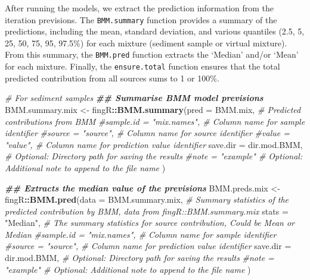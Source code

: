 \documentclass[
]{article}
\newenvironment{Shaded}{\begin{snugshade}}{\end{snugshade}}
\newcommand{\AttributeTok}[1]{\textcolor[rgb]{0.13,0.29,0.53}{#1}}
\newcommand{\CommentTok}[1]{\textcolor[rgb]{0.56,0.35,0.01}{\textit{#1}}}
\newcommand{\DocumentationTok}[1]{\textcolor[rgb]{0.56,0.35,0.01}{\textbf{\textit{#1}}}}
\newcommand{\FunctionTok}[1]{\textcolor[rgb]{0.13,0.29,0.53}{\textbf{#1}}}
\newcommand{\NormalTok}[1]{#1}
\newcommand{\OtherTok}[1]{\textcolor[rgb]{0.56,0.35,0.01}{#1}}
\newcommand{\SpecialCharTok}[1]{\textcolor[rgb]{0.81,0.36,0.00}{\textbf{#1}}}
\newcommand{\StringTok}[1]{\textcolor[rgb]{0.31,0.60,0.02}{#1}}
\begin{document}
After running the models, we extract the prediction information from the
iteration previsions. The \texttt{BMM.summary} function provides a
summary of the predictions, including the mean, standard deviation, and
various quantiles (2.5, 5, 25, 50, 75, 95, 97.5\%) for each mixture
(sediment sample or virtual mixture). From this summary, the
\texttt{BMM.pred} function extracts the `Median' and/or `Mean' for each
mixture. Finally, the \texttt{ensure.total} function ensures that the
total predicted contribution from all sources sums to 1 or 100\%.

\begin{Shaded}
\begin{Highlighting}[]
\CommentTok{\# For sediment samples}
\DocumentationTok{\#\# Summarise BMM model previsions}
\NormalTok{BMM.summary.mix }\OtherTok{\textless{}{-}}\NormalTok{ fingR}\SpecialCharTok{::}\FunctionTok{BMM.summary}\NormalTok{(}\AttributeTok{pred =}\NormalTok{ BMM.mix,            }\CommentTok{\# Predicted contributions from BMM}
                                      \CommentTok{\#sample.id = "mix.names",  \# Column name for sample identifier}
                                      \CommentTok{\#source = "source",        \# Column name for source identifier}
                                      \CommentTok{\#value = "value",          \# Column name for prediction value identifier}
                                      \AttributeTok{save.dir =}\NormalTok{ dir.mod.BMM,    }\CommentTok{\# Optional: Directory path for saving the results}
                                      \CommentTok{\#note = "example"          \# Optional: Additional note to append to the file name}
\NormalTok{                                      )}

\DocumentationTok{\#\# Extracts the median value of the previsions}
\NormalTok{BMM.preds.mix }\OtherTok{\textless{}{-}}\NormalTok{ fingR}\SpecialCharTok{::}\FunctionTok{BMM.pred}\NormalTok{(}\AttributeTok{data =}\NormalTok{ BMM.summary.mix,         }\CommentTok{\# Summary statistics of the predicted contribution by BMM, data from fingR::BMM.summary.mix}
                                 \AttributeTok{stats =} \StringTok{"Median"}\NormalTok{,               }\CommentTok{\# The summary statistics for source contribution, Could be Mean or Median}
                                 \CommentTok{\#sample.id = "mix.names",       \# Column name for sample identifier}
                                 \CommentTok{\#source = "source",             \# Column name for prediction value identifier}
                                 \AttributeTok{save.dir =}\NormalTok{ dir.mod.BMM,         }\CommentTok{\# Optional: Directory path for saving the results}
                                 \CommentTok{\#note = "example"               \# Optional: Additional note to append to the file name}
\NormalTok{                                 )}


\end{Highlighting}
\end{Shaded}
\end{document}
